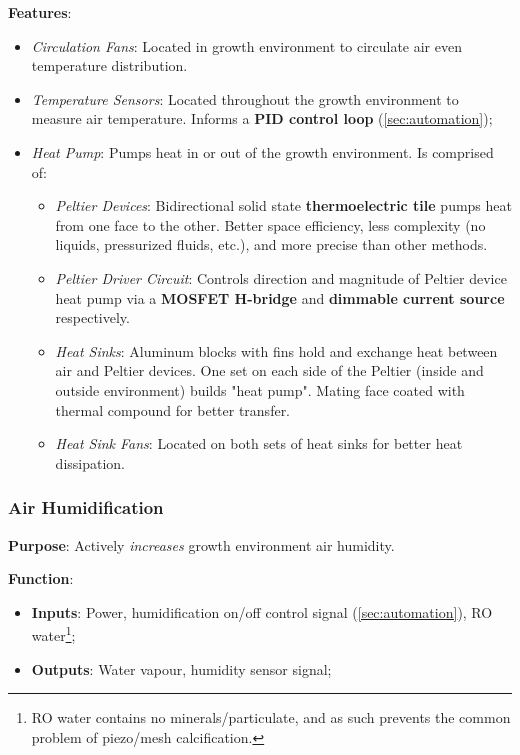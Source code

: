 \documentclass{report}
\begin{document}
\textbf{Features}:
\begin{itemize}
    \item \textit{Circulation Fans}: Located in growth environment to circulate air even temperature distribution.
    \item \textit{Temperature Sensors}: Located throughout the growth environment to measure air temperature. Informs a \textbf{PID control loop} (\ref{sec:automation});
    \item \textit{Heat Pump}: Pumps heat in or out of the growth environment. Is comprised of:
    \begin{itemize}
        \item \textit{Peltier Devices}: Bidirectional solid state \textbf{thermoelectric tile} pumps heat from one face to the other. Better space efficiency, less complexity (no liquids, pressurized fluids, etc.), and more precise than other methods.
        \item \textit{Peltier Driver Circuit}: Controls direction and magnitude of Peltier device heat pump via a \textbf{MOSFET H-bridge} and \textbf{dimmable current source} respectively.
        \item \textit{Heat Sinks}: Aluminum blocks with fins hold and exchange heat between air and Peltier devices. One set on each side of the Peltier (inside and outside environment) builds "heat pump". Mating face coated with thermal compound for better transfer.
        \item \textit{Heat Sink Fans}: Located on both sets of heat sinks for better heat dissipation.
    \end{itemize}
\end{itemize}

\newpage

\subsubsection{Air Humidification}
\label{sec:airhum}

\textbf{Purpose}: Actively \textit{increases} growth environment air humidity.

\textbf{Function}:
\begin{itemize}
    \item \textbf{Inputs}: Power, humidification on/off control signal (\ref{sec:automation}), RO water\footnote{RO water contains no minerals/particulate, and as such prevents the common problem of piezo/mesh calcification.};
    \item \textbf{Outputs}: Water vapour, humidity sensor signal;
\end{itemize}
\end{document}
